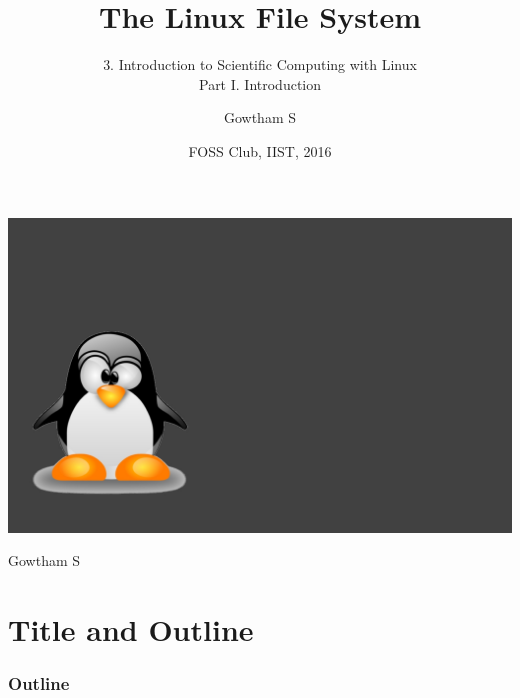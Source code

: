 \documentclass{beamer}
\title[Linux File System]{\color{white} \textbf{The Linux File System\\}} %
\subtitle{\color{white}3. Introduction to Scientific Computing with Linux\\Part I. Introduction}
\institute[FOSS-IIST] %
{

\begin{flushright}
\color{white}
{
B.Tech Aerospace Engineering\\
Indian Institute of Space Science and Technology} %

 \textit{\\gowtham.sc13b020@ug.iist.ac.in}
\\ 
 \end{flushright} %
}
\date{\color{white} {FOSS Club, IIST, 2016}}
\begin{document}
\renewcommand*\footnoterule{}


\newcommand\blfootnote[1]{%
  \begingroup
  \renewcommand\thefootnote{}\footnote{#1}%
  \addtocounter{footnote}{-1}%
  \endgroup
}


\usebackgroundtemplate%
{%
    \includegraphics[width=\paperwidth,height=\paperheight]{linux_bg}%
}
 
{
\begin{frame}

\vspace*{3.8cm}
\color{white}
\begin{flushright}
Gowtham S
\end{flushright}
\vspace{-4.5cm}

\titlepage %


	\end{frame}
}
\section*{Title and Outline}

\author{Gowtham S}

\addtocounter{framenumber}{-1}

 \usebackgroundtemplate{}

\begin{frame}
\frametitle{Outline}

\tableofcontents
\end{frame}
\end{document}
